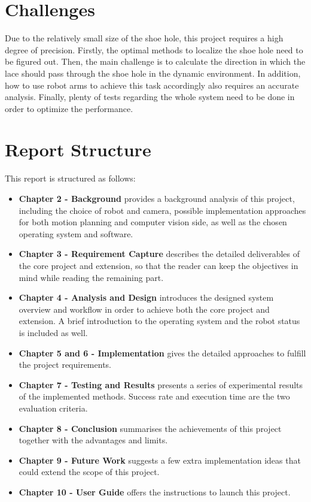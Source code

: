 \section{Challenges}
Due to the relatively small size of the shoe hole, this project requires a high degree of precision. Firstly, the optimal methods to localize the shoe hole need to be figured out. Then, the main challenge is to calculate the direction in which the lace should pass through the shoe hole in the dynamic environment. In addition, how to use robot arms to achieve this task accordingly also requires an accurate analysis. Finally, plenty of tests regarding the whole system need to be done in order to optimize the performance.

\section{Report Structure}
This report is structured as follows:

\begin{itemize}
    \item \textbf{Chapter 2 - Background} provides a background analysis of this project, including the choice of robot and camera, possible implementation approaches for both motion planning and computer vision side, as well as the chosen operating system and software. 
    \item \textbf{Chapter 3 - Requirement Capture} describes the detailed deliverables of the core project and extension, so that the reader can keep the objectives in mind while reading the remaining part.
    \item \textbf{Chapter 4 - Analysis and Design} introduces the designed system overview and workflow in order to achieve both the core project and extension. A brief introduction to the operating system and the robot status is included as well.
    \item \textbf{Chapter 5 and 6 - Implementation} gives the detailed approaches to fulfill the project requirements.
    \item \textbf{Chapter 7 - Testing and Results} presents a series of experimental results of the implemented methods. Success rate and execution time are the two evaluation criteria.
    \item \textbf{Chapter 8 - Conclusion} summarises the achievements of this project together with the advantages and limits. 
    \item \textbf{Chapter 9 - Future Work} suggests a few extra implementation ideas that could extend the scope of this project. 
    \item \textbf{Chapter 10 - User Guide} offers the instructions to launch this project.
\end{itemize}
